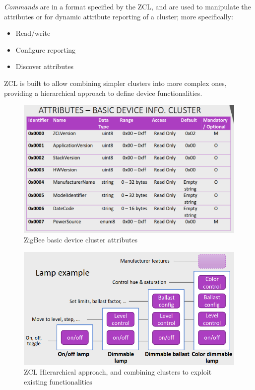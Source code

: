 \begin{paracol}{2}

   
   {\ns\textit{Commands} are in a format specified by the ZCL, and are used to manipulate the attributes or for dynamic attribute reporting of a cluster; more specifically:
   \begin{itemize}
      \item Read/write
      \item Configure reporting
      \item Discover attributes
   \end{itemize}}
   
   ZCL is built to allow combining simpler clusters into more complex ones, providing a hierarchical approach to define device functionalities.

   \switchcolumn

   \begin{figure}[htbp]
      \centering
      \includegraphics{images/zigbee_attributes.png}
      \caption{ZigBee basic device cluster attributes}
      \label{fig:zigbee_attributes}
   \end{figure}
\end{paracol}

\begin{figure}[htbp]
      \centering
      \includegraphics{images/zigbee_zclcombining.png}
      \caption{ZCL Hierarchical approach, and combining clusters to exploit existing functionalities}
      \label{fig:zigbee_zclcombining}
\end{figure}

